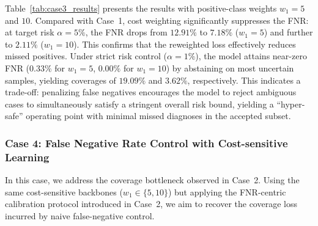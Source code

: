 \documentclass[journal,twoside,web]{ieeecolor}
\begin{document}
Table~\ref{tab:case3_results} presents the results with positive-class weights $w_1 = 5$ and $10$. Compared with Case~1, cost weighting significantly suppresses the FNR: at target risk $\alpha=5\%$, the FNR drops from $12.91\%$ to $7.18\%$ ($w_1=5$) and further to $2.11\%$ ($w_1=10$). This confirms that the reweighted loss effectively reduces missed positives. Under strict risk control ($\alpha=1\%$), the model attains near-zero FNR ($0.33\%$ for $w_1=5$, $0.00\%$ for $w_1=10$) by abstaining on most uncertain samples, yielding coverages of $19.09\%$ and $3.62\%$, respectively. This indicates a trade-off: penalizing false negatives encourages the model to reject ambiguous cases to simultaneously satisfy a stringent overall risk bound, yielding a “hyper-safe” operating point with minimal missed diagnoses in the accepted subset.



\subsubsection{\textbf{Case 4: False Negative Rate Control with Cost-sensitive Learning}}
\label{sec:case4_results}

In this case, we address the coverage bottleneck observed in Case~2. Using the same cost-sensitive backbones ($w_{1} \in \{5, 10\}$) but applying the FNR-centric calibration protocol introduced in Case~2, we aim to recover the coverage loss incurred by naive false-negative control.

\begin{table}[htbp]
    \centering
    \caption{The selective classification performance of Case 4 ($w_{1}=5$ and $w_{1}=10$).}
    \label{tab:case4_results}
\end{table}
\end{document}
